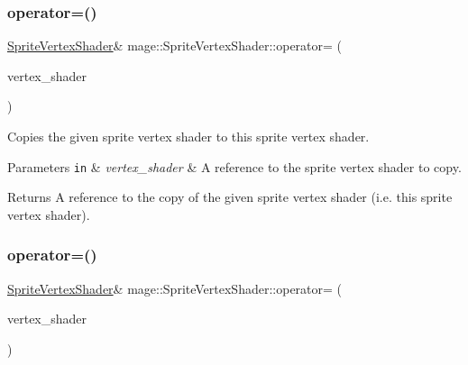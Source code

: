 \subsubsection{\texorpdfstring{operator=()}{operator=()}\hspace{0.1cm}{\footnotesize\ttfamily [1/2]}}
{\footnotesize\ttfamily \hyperlink{classmage_1_1_sprite_vertex_shader}{Sprite\+Vertex\+Shader}\& mage\+::\+Sprite\+Vertex\+Shader\+::operator= (\begin{DoxyParamCaption}\item[{const \hyperlink{classmage_1_1_sprite_vertex_shader}{Sprite\+Vertex\+Shader} \&}]{vertex\+\_\+shader }\end{DoxyParamCaption})\hspace{0.3cm}{\ttfamily [delete]}}

Copies the given sprite vertex shader to this sprite vertex shader.


\begin{DoxyParams}[1]{Parameters}
\mbox{\tt in}  & {\em vertex\+\_\+shader} & A reference to the sprite vertex shader to copy. \\
\hline
\end{DoxyParams}
\begin{DoxyReturn}{Returns}
A reference to the copy of the given sprite vertex shader (i.\+e. this sprite vertex shader). 
\end{DoxyReturn}
\hypertarget{classmage_1_1_sprite_vertex_shader_aac64cf5df2b118ba95be72aef2bd3dca}{}\label{classmage_1_1_sprite_vertex_shader_aac64cf5df2b118ba95be72aef2bd3dca} 
\subsubsection{\texorpdfstring{operator=()}{operator=()}\hspace{0.1cm}{\footnotesize\ttfamily [2/2]}}
{\footnotesize\ttfamily \hyperlink{classmage_1_1_sprite_vertex_shader}{Sprite\+Vertex\+Shader}\& mage\+::\+Sprite\+Vertex\+Shader\+::operator= (\begin{DoxyParamCaption}\item[{\hyperlink{classmage_1_1_sprite_vertex_shader}{Sprite\+Vertex\+Shader} \&\&}]{vertex\+\_\+shader }\end{DoxyParamCaption})\hspace{0.3cm}{\ttfamily [delete]}}

